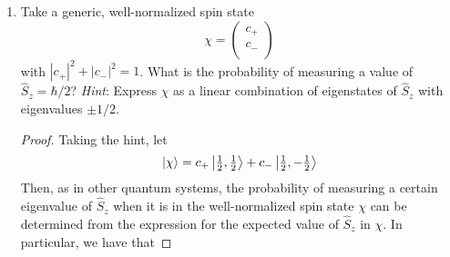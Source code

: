 \documentclass[../psets.tex]{subfiles}
\begin{document}
\begin{enumerate}
\begin{enumerate}
\begin{proof}
\begin{equation*}
\begin{cases}
                \end{cases}
            \end{equation*}
            over the real numbers $\R$ to obtain, WLOG, that
            \begin{align*}
                \lambda_1 &= \frac{\hbar}{2}&
                \lambda_2 &= -\frac{\hbar}{2}
            \end{align*}
            This provides the desired verification.\par
            \underline{Alternate, simpler method of solving the second half of the question}: Since each $\hat{S}_i^2$ has eigenvalue $\hbar^2/4$, it follows that every $\hat{S}_i$ has eigenvalue\footnote{Is this implication well-supported mathematically?? What constraints do we need? Is it important that the $\hat{S}_i$ are operators on a \emph{complex} vector space? Do we still need the traceless and/or Hermitian conditions somewhere, or are we already using them implicitly? Which theorem allows us to do this? I'm thinking the answer might lie somewhere in Chapter 7 of \emph{Linear Algebra Done Right}...}
            \begin{equation*}
                \sqrt{\frac{\hbar^2}{4}} = \pm\frac{\hbar}{2}
            \end{equation*}
        \end{proof}
        \pagebreak
        \item Take a generic, well-normalized spin state
        \begin{equation}
            \chi =
            \begin{pmatrix}
                c_+\\
                c_-\\
            \end{pmatrix}
        \end{equation}
        with $|c_+|^2+|c_-|^2=1$. What is the probability of measuring a value of $\hat{S}_z=\hbar/2$? \emph{Hint}: Express $\chi$ as a linear combination of eigenstates of $\hat{S}_z$ with eigenvalues $\pm 1/2$.
        \begin{proof}
            Taking the hint, let
            \begin{equation*}
                \ket{\chi} = c_+\ket{\tfrac{1}{2},\tfrac{1}{2}}+c_-\ket{\tfrac{1}{2},-\tfrac{1}{2}}
            \end{equation*}
            Then, as in other quantum systems, the probability of measuring a certain eigenvalue of $\hat{S}_z$ when it is in the well-normalized spin state $\chi$ can be determined from the expression for the expected value of $\hat{S}_z$ in $\chi$. In particular, we have that

\end{proof}
\end{enumerate}
\end{enumerate}
\end{document}
